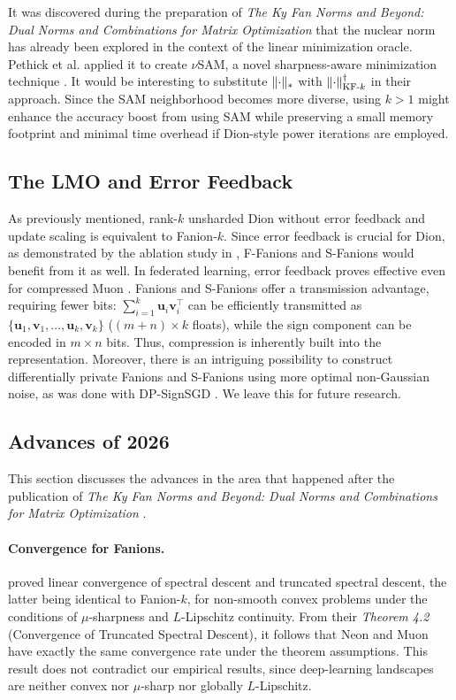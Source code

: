 \documentclass[a4paper,14pt,oneside]{extarticle}
\DeclarePairedDelimiter{\normn}{\|}{\|_{*}}
\DeclarePairedDelimiter{\normkfk}{\|}{\|_{\text{KF-}k}}
\newcommand{\vu}{\mathbf{u}}
\newcommand{\vv}{\mathbf{v}}
\begin{document}
It was discovered during the preparation of \emph{The Ky Fan Norms and Beyond: Dual Norms and Combinations for Matrix Optimization} \citep{kravatskiy2025kyfannormsbeyond} that the nuclear norm has already been explored in the context of the linear minimization oracle. Pethick et al. applied it to create $\nu$SAM, a novel sharpness-aware minimization technique \citep{pethick2025sam}. It would be interesting to substitute $\normn{\cdot}$ with $\normkfk{\cdot}^\dagger$ in their approach. Since the SAM neighborhood becomes more diverse, using $k > 1$ might enhance the accuracy boost from using SAM while preserving a small memory footprint and minimal time overhead if Dion-style power iterations are employed.

\subsection{The LMO and Error Feedback}

As previously mentioned, rank-$k$ unsharded Dion without error feedback and update scaling is equivalent to Fanion-$k$. Since error feedback is crucial for Dion, as demonstrated by the ablation study in \citep{ahn2025dion}, F-Fanions and S-Fanions would benefit from it as well. In federated learning, error feedback proves effective even for compressed Muon \citep{gruntkowska2025efmuon}. Fanions and S-Fanions offer a transmission advantage, requiring fewer bits: $\sum_{i=1}^k \vu_i \vv_i^\top$ can be efficiently transmitted as $\{\vu_1, \vv_1, \dots, \vu_k, \vv_k\}$ ($(m+n)\times k$ floats), while the sign component can be encoded in $m \times n$ bits. Thus, compression is inherently built into the representation. Moreover, there is an intriguing possibility to construct differentially private Fanions and S-Fanions using more optimal non-Gaussian noise, as was done with DP-SignSGD \citep{jang2024dplogsign}. We leave this for future research.

\subsection{Advances of 2026}
This section discusses the advances in the area that happened after the publication of \emph{The Ky Fan Norms and Beyond: Dual Norms and Combinations for Matrix Optimization} \citep{kravatskiy2025kyfannormsbeyond}.

\paragraph{Convergence for Fanions.} \citet{yang2026fanionconvergence} proved linear convergence of spectral descent and truncated spectral descent, the latter being identical to Fanion-$k$, for non-smooth convex problems under the conditions of $\mu$-sharpness and $L$-Lipschitz continuity. From their \emph{Theorem 4.2} (Convergence of Truncated Spectral Descent), it follows that Neon and Muon have exactly the same convergence rate under the theorem assumptions. This result does not contradict our empirical results, since deep-learning landscapes are neither convex nor $\mu$-sharp nor globally $L$-Lipschitz.
\end{document}
